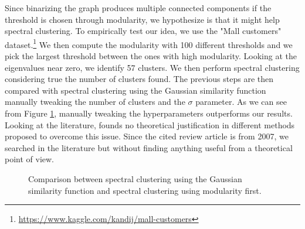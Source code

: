 \documentclass{article}
\begin{document}
Since binarizing the graph produces multiple connected components if the threshold is chosen through modularity,
we hypothesize is that it might help spectral clustering.
To empirically test our idea, we use the "Mall customers" dataset.\footnote{\url{https://www.kaggle.com/kandij/mall-customers}}
We then compute the modularity with 100 different thresholds and we pick the largest threshold between the ones with high modularity.
Looking at the eigenvalues near zero, we identify 57 clusters.
We then perform spectral clustering considering true the number of clusters found.
The previous steps are then compared with spectral clustering using the Gaussian similarity function manually tweaking the number of clusters
and the $\sigma$ parameter. As we can see from Figure \ref{figure:realworld},
manually tweaking the hyperparameters outperforms our results.
Looking at the literature, \cite{DBLP:journals/corr/abs-0711-0189} founds no theoretical justification in different methods proposed to overcome this issue.
Since the cited review article is from 2007, we searched in the literature but without finding anything useful from a theoretical point of view.

\begin{figure}[hb]
    \hfill
    \hfill
    \hfill
    \hfill
    \caption{Comparison between spectral clustering using the Gaussian similarity function and spectral clustering using modularity first.}%
    \label{figure:realworld}%
\end{figure}

\pagebreak
\nocite{*}


\end{document}
